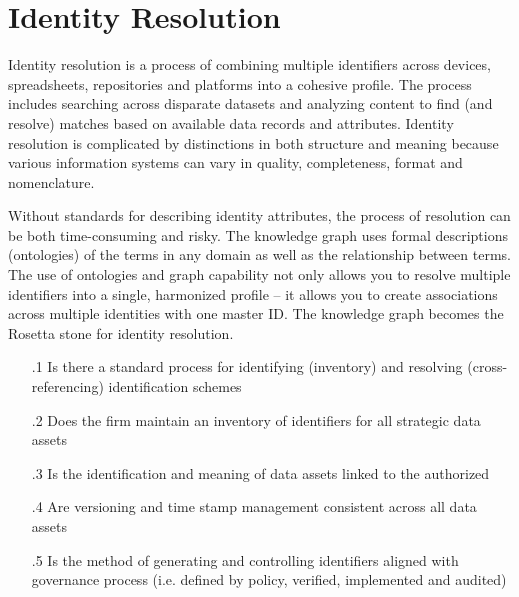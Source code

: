 \section{Identity Resolution}\label{sec:ekgmm-b-2-1} %

Identity resolution is a process of combining multiple identifiers across devices, spreadsheets, repositories and
platforms into a cohesive profile.
The process includes searching across disparate datasets and analyzing content to find (and resolve) matches based
on available data records and attributes.
Identity resolution is complicated by distinctions in both structure and meaning because various information systems
can vary in quality, completeness, format and nomenclature.

\kgmmekgrationalesection

Without standards for describing identity attributes, the process of resolution can be both time-consuming and risky.
The knowledge graph uses formal descriptions (ontologies) of the terms in any domain as well as the relationship
between terms.
The use of ontologies and graph capability not only allows you to resolve multiple identifiers into a single,
harmonized profile -- it allows you to create associations across multiple identities with one master ID.
The knowledge graph becomes the Rosetta stone for identity resolution.

\kgmmcorequestionssection

\begin{itemize}[leftmargin=.5in]

  \item [\thesection.1] Is there a standard process for identifying (inventory) and resolving (cross-referencing)
                        identification schemes
  \item [\thesection.2] Does the firm maintain an inventory of identifiers for all strategic data assets
  \item [\thesection.3] Is the identification and meaning of data assets linked to the authorized 
  \item [\thesection.4] Are versioning and time stamp management consistent across all data assets
  \item [\thesection.5] Is the method of generating and controlling identifiers aligned with governance process
                        (i.e. defined by policy, verified, implemented and audited)

\end{itemize}


